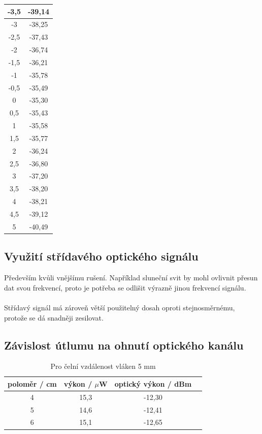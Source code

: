 \begin{table}[!htb]
\begin{minipage}{.5\linewidth}
\begin{tabular}{| c | c |}
     \hline
  -3,5 & -39,14 \\ 
     \hline
   -3 & -38,25 \\ 
     \hline
   -2,5 & -37,43 \\  
     \hline
   -2 & -36,74 \\ 
     \hline
   -1,5 & -36,21 \\ 
     \hline
   -1 & -35,78 \\ 
     \hline
   -0,5 & -35,49 \\ 
     \hline
   0 & -35,30 \\ 
     \hline
   0,5 & -35,43 \\ 
     \hline
   1 & -35,58 \\ 
     \hline
   1,5 & -35,77 \\ 
     \hline
   2 & -36,24 \\ 
     \hline
   2,5 & -36,80 \\  
     \hline
   3 & -37,20 \\ 
     \hline
  3,5 & -38,20 \\ 
     \hline
  4 & -38,21 \\
     \hline
  4,5 & -39,12 \\ 
     \hline
  5 & -40,49 \\ 
     \hline
        \end{tabular}
    \end{minipage} 
\end{table}

\newpage
\subsection{Využití střídavého optického signálu}

Především kvůli vnějšímu rušení. Například sluneční svit by mohl ovlivnit přesun dat svou frekvencí, proto je potřeba se odlišit výrazně jinou frekvencí signálu.
\\\\
Střídavý signál má zároveň větší použitelný dosah oproti stejnosměrnému, protože se dá snadněji zesilovat. 


\subsection{Závislost útlumu na ohnutí optického kanálu}

\begin{table}[h!]

\caption{Pro čelní vzdálenost vláken 5 mm }
\centering
\begin{tabular}{ | c | c | c | c | } 
  \hline
  poloměr / cm & výkon / $\mu$W & optický výkon / dBm  \\ 
     \hline
  4 & 15,3 & -12,30\\ 
     \hline
  5 & 14,6 & -12,41\\ 
     \hline
  6 & 15,1 & -12,65\\
     \hline
\end{tabular}
\label{table:4}
\end{table}

